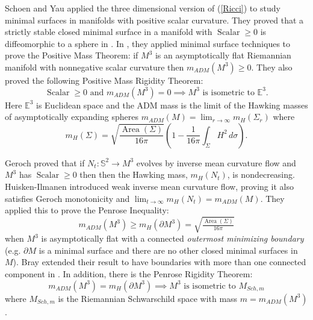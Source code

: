 \documentclass[12pt]{amsart}
\begin{document}
Schoen and Yau applied the three
dimensional version of (\ref{Ricci}) to study minimal surfaces in
manifolds with positive scalar curvature.
They proved that a strictly stable closed
minimal surface in a manifold with ${\operatorname{Scalar}}\ge 0$ 
is diffeomorphic to a sphere in
\cite{Schoen-Yau-min-surf}.  In \cite{Schoen-Yau-positive-mass}, they
 applied minimal surface techniques 
to prove the Positive Mass Theorem:
 if $M^3$ is an asymptotically flat Riemannian manifold with
nonnegative scalar curvature then $m_{ADM}(M^3) \ge 0$.
They also proved the following Positive Mass Rigidity Theorem:
\begin{equation} \label{PMT-Rigidity}
{\operatorname{Scalar}} \ge 0 \textrm{ and }
m_{ADM}(M^3)=0 \implies M^3 \textrm{ is isometric to }\mathbb{E}^3.
\end{equation}
Here $\mathbb{E}^3$ is Euclidean space and the ADM mass is
the limit of the Hawking masses of asymptotically expanding 
spheres
$
m_{ADM}(M) = \lim_{r\to\infty} m_H(\Sigma_r)$ where
\begin{equation}\label{Hawking-mass}
 m_H(\Sigma)=\sqrt{\frac{{\operatorname{Area}}(\Sigma)}{16\pi}}
\left(1 - \frac{1}{16\pi}\int_\Sigma H^2 \, d\sigma\right).
\end{equation}

Geroch  proved that if $N_t: \mathbb{S}^2 \to M^3$
evolves by inverse mean curvature flow
and $M^3$ has ${\operatorname{Scalar}} \ge 0$ then
then the Hawking mass, $m_H(N_t)$, is nondecreasing. 
Huisken-Ilmanen introduced weak inverse mean curvature flow,
proving it also satisfies Geroch monotonicity and 
$\lim_{t\to\infty} m_H(N_t)= m_{ADM}(M)$.   
They
applied this to prove the Penrose
Inequality: 
\begin{equation}\label{penrose}
m_{ADM}(M^3)\ge m_H(\partial M^3) = \sqrt{\tfrac{{\operatorname{Area}}(\Sigma)}{16\pi}}
\end{equation}
when $M^3$ is asymptotically flat with a
connected {\em outermost minimizing boundary} (e.g. $\partial M$ is a minimal surface and there are no other closed minimal surfaces in $M$).  
Bray extended their result to have boundaries with more than one connected
component in \cite{Bray-Penrose}.   In addition, there is the Penrose Rigidity Theorem:
\begin{equation}\label{penrose}
m_{ADM}(M^3)= m_H(\partial M^3) \implies M^3 \textrm{ is isometric to }M_{Sch,m}
\end{equation}
where $M_{Sch,m}$ is the Riemannian Schwarschild space with
mass $m=m_{ADM}(M^3)$.
\end{document}
